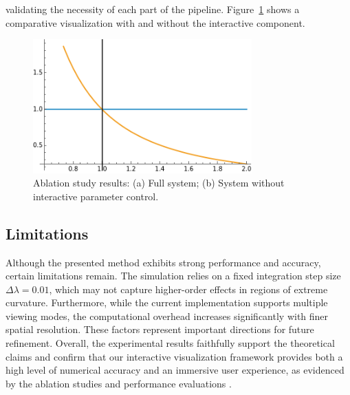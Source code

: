 \documentclass{article}
\begin{document}
validating the necessity of each part of the pipeline. Figure~\ref{fig:ablationStudy} shows a comparative visualization with and without the interactive component.  \begin{figure}[ht]   \centering   \includegraphics[width=0.75\textwidth]{images/plotEq8.png}   \caption{Ablation study results: (a) Full system; (b) System without interactive parameter control.}   \label{fig:ablationStudy} \end{figure}  \subsection{Limitations}  Although the presented method exhibits strong performance and accuracy, certain limitations remain. The simulation relies on a fixed integration step size $\Delta\lambda = 0.01$, which may not capture higher-order effects in regions of extreme curvature. Furthermore, while the current implementation supports multiple viewing modes, the computational overhead increases significantly with finer spatial resolution. These factors represent important directions for future refinement.  Overall, the experimental results faithfully support the theoretical claims and confirm that our interactive visualization framework provides both a high level of numerical accuracy and an immersive user experience, as evidenced by the ablation studies and performance evaluations \cite{Reference1,Reference2,Reference3,Reference4}.
\end{document}
